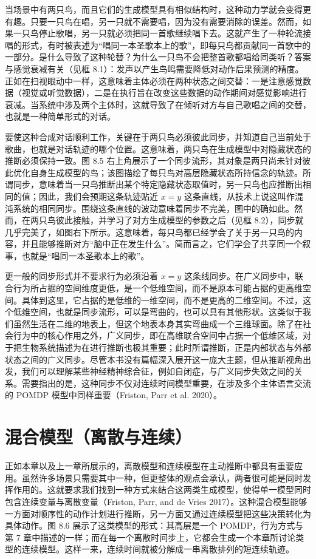 当场景中有两只鸟，而且它们的生成模型具有相似结构时，这种动力学就会变得更有趣。只要一只鸟在唱，另一只就不需要唱，因为没有需要消除的误差。然而，如果一只鸟停止歌唱，另一只就必须把同一首歌继续唱下去。这就产生了一种轮流接唱的形式，有时被表述为“唱同一本圣歌本上的歌”，即每只鸟都贡献同一首歌中的一部分。是什么导致了这种轮替？为什么一只鸟不会把整首歌都唱给同类听？答案与感觉衰减有关（见框 8.1）：发声以产生鸟鸣需要降低对动作后果预测的精度。正如在扫视眼动中一样，这意味着主体必须在两种状态之间交替：一是注意感觉数据（视觉或听觉数据），二是在执行旨在改变这些数据的动作期间对感觉影响进行衰减。当系统中涉及两个主体时，这就导致了在倾听对方与自己歌唱之间的交替，也就是一种简单形式的对话。

要使这种合成对话顺利工作，关键在于两只鸟必须彼此同步，并知道自己当前处于歌曲，也就是对话轨迹的哪个位置。这意味着，两只鸟在生成模型中对隐藏状态的推断必须保持一致。图 8.5 右上角展示了一个同步流形，其对象是两只尚未针对彼此优化自身生成模型的鸟；该图描绘了每只鸟对高层隐藏状态所持信念的轨迹。所谓同步，意味着当一只鸟推断出某个特定隐藏状态取值时，另一只鸟也应推断出相同的值；因此，我们会预期这条轨迹贴近 $x = y$ 这条直线，从技术上说这叫作混沌系统的相同同步。围绕这条直线的波动意味着同步不完美，图中的确如此。然而，在两只鸟彼此接触，并学习了对方生成模型的参数之后（见框 8.2），同步就几乎完美了，如图右下所示。这意味着，每只鸟都已经学会了关于另一只鸟的内容，并且能够推断对方“脑中正在发生什么”。简而言之，它们学会了共享同一个叙事，也就是“唱同一本圣歌本上的歌”。

更一般的同步形式并不要求行为必须沿着 $x = y$ 这条线同步。在广义同步中，联合行为所占据的空间维度更低，是一个低维空间，而不是原本可能占据的更高维空间。具体到这里，它占据的是低维的一维空间，而不是更高的二维空间。不过，这个低维空间，也就是同步流形，可以是弯曲的，也可以具有其他形状。这类似于我们虽然生活在二维的地表上，但这个地表本身其实弯曲成一个三维球面。除了在社会行为中的核心作用之外，广义同步，即在高维联合空间中占据一个低维区域，对于把生物系统描述为在进行推断也极其重要；此时所谓推断，正是内部状态与外部状态之间的广义同步。尽管本书没有篇幅深入展开这一庞大主题，但从推断视角出发，我们可以理解某些神经精神综合征，例如自闭症，与广义同步失效之间的关系。需要指出的是，这种同步不仅对连续时间模型重要，在涉及多个主体语言交流的 POMDP 模型中同样重要（Friston, Parr et al. 2020）。

\section{混合模型（离散与连续）}

正如本章以及上一章所展示的，离散模型和连续模型在主动推断中都具有重要应用。虽然许多场景只需要其中一种，但更整体的观点会承认，两者很可能是同时发挥作用的。这就要求我们找到一种方式来结合这两类生成模型，使得单一模型同时包含连续变量与离散变量（Friston, Parr, and de Vries 2017）。这种混合模型能够一方面对顺序性的动作计划进行推断，另一方面又通过连续模型把这些决策转化为具体动作。图 8.6 展示了这类模型的形式：其高层是一个 POMDP，行为方式与第 7 章中描述的一样；而在每一个离散时间步上，它都会生成一个本章所讨论类型的连续模型。这样一来，连续时间就被分解成一串离散排列的短连续轨迹。

